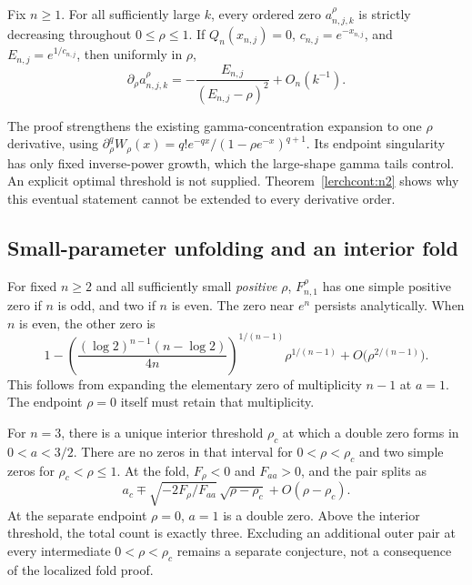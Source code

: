 \begin{theorem}\label{lerchcont:monotonicity}
Fix $n\ge1$. For all sufficiently large $k$, every ordered zero
$a_{n,j,k}^{\rho}$ is strictly decreasing throughout $0\le\rho\le1$.
If $Q_n(x_{n,j})=0$, $c_{n,j}=e^{-x_{n,j}}$, and
$E_{n,j}=e^{1/c_{n,j}}$, then uniformly in $\rho$,
\[
 \partial_\rho a_{n,j,k}^{\rho}
 =-\frac{E_{n,j}}{(E_{n,j}-\rho)^2}+O_n(k^{-1}).
\]
\end{theorem}
The proof strengthens the existing gamma-concentration expansion to one
$\rho$ derivative, using
$\partial_\rho^qW_\rho(x)=q!e^{-qx}/(1-\rho e^{-x})^{q+1}$.
Its endpoint singularity has only fixed inverse-power growth, which the
large-shape gamma tails control. An explicit optimal threshold is not supplied.
Theorem~\ref{lerchcont:n2} shows why this eventual statement cannot be extended
to every derivative order.

\subsection{Small-parameter unfolding and an interior fold}
For fixed $n\ge2$ and all sufficiently small \emph{positive} $\rho$,
$F_{n,1}^{\rho}$ has one simple positive zero if $n$ is odd, and two if $n$
is even. The zero near $e^n$ persists analytically. When $n$ is even, the
other zero is
\[
 1-\left(\frac{(\log2)^{n-1}(n-\log2)}{4n}\right)^{1/(n-1)}
       \rho^{1/(n-1)}+O\bigl(\rho^{2/(n-1)}\bigr).
\]
This follows from expanding the elementary zero of multiplicity $n-1$ at
$a=1$. The endpoint $\rho=0$ itself must retain that multiplicity.

For $n=3$, there is a unique interior threshold $\rho_c$ at which a double
zero forms in $0<a<3/2$. There are no zeros in that interval for
$0<\rho<\rho_c$ and two simple zeros for $\rho_c<\rho\le1$. At the fold,
$F_\rho<0$ and $F_{aa}>0$, and the pair splits as
\[
 a_c\mp\sqrt{-2F_\rho/F_{aa}}\,\sqrt{\rho-\rho_c}+O(\rho-\rho_c).
\]
At the separate endpoint $\rho=0$, $a=1$ is a double zero.
Above the interior threshold, the total count is exactly three. Excluding an
additional outer pair at every intermediate $0<\rho<\rho_c$ remains a
separate conjecture, not a consequence of the localized fold proof.

